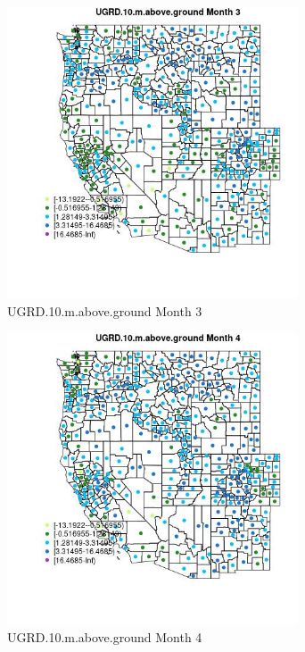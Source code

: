 \begin{figure} 
\centering  
\includegraphics[width=0.77\textwidth]{Code_Outputs/df_report_ML_predictors_CountyCentroid_Locations_Dates_2008-01-01to2018-12-31_MapObsMo3UGRD10maboveground.jpg} 
\caption{\label{fig:df_report_ML_predictors_CountyCentroid_Locations_Dates_2008-01-01to2018-12-31MapObsMo3UGRD10maboveground}UGRD.10.m.above.ground Month 3} 
\end{figure} 
 

\clearpage 

\begin{figure} 
\centering  
\includegraphics[width=0.77\textwidth]{Code_Outputs/df_report_ML_predictors_CountyCentroid_Locations_Dates_2008-01-01to2018-12-31_MapObsMo4UGRD10maboveground.jpg} 
\caption{\label{fig:df_report_ML_predictors_CountyCentroid_Locations_Dates_2008-01-01to2018-12-31MapObsMo4UGRD10maboveground}UGRD.10.m.above.ground Month 4} 
\end{figure} 
 

